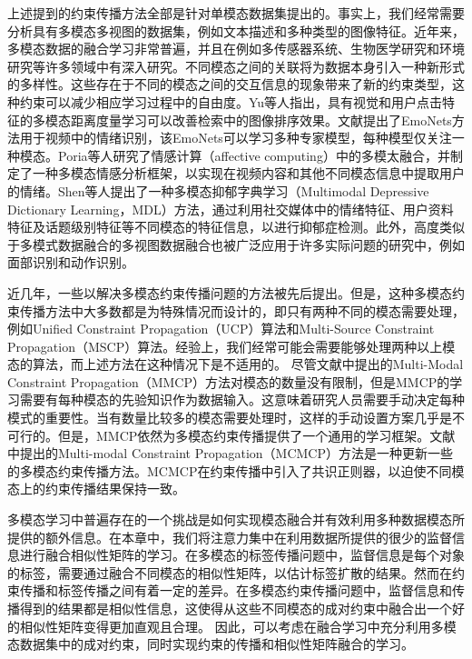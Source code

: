 上述提到的约束传播方法全部是针对单模态数据集提出的。事实上，我们经常需要分析具有多模态多视图的数据集，例如文本描述和多种类型的图像特征。近年来，多模态数据的融合学习非常普遍，并且在例如多传感器系统、生物医学研究和环境研究等许多领域中有深入研究。不同模态之间的关联将为数据本身引入一种新形式的多样性。这些存在于不同的模态之间的交互信息的现象带来了新的约束类型，这种约束可以减少相应学习过程中的自由度\cite{lahat2015multimodal}。Yu等人指出，具有视觉和用户点击特征的多模态距离度量学习可以改善检索中的图像排序效果\cite{yu2017deep}。文献\parencite{kahou2016emonets}提出了EmoNets方法用于视频中的情绪识别，该EmoNets可以学习多种专家模型，每种模型仅关注一种模态。Poria等人研究了情感计算（affective computing）中的多模太融合，并制定了一种多模态情感分析框架，以实现在视频内容和其他不同模态信息中提取用户的情绪\cite{poria2017review,poria2017ensemble}。Shen等人提出了一种多模态抑郁字典学习（Multimodal Depressive Dictionary Learning，MDL）\cite{shen2017depression}方法，通过利用社交媒体中的情绪特征、用户资料特征及话题级别特征等不同模态的特征信息，以进行抑郁症检测。此外，高度类似于多模式数据融合的多视图数据融合也被广泛应用于许多实际问题的研究中，例如面部识别\cite{kan2016multi}和动作识别\cite{shao2016kernelized}。

近几年，一些以解决多模态约束传播问题的方法被先后提出\cite{fu2011multi,fu2012modalities,lu2013unified,lu2013exhaustive}。但是，这种多模态约束传播方法中大多数都是为特殊情况而设计的，即只有两种不同的模态需要处理，例如Unified Constraint Propagation（UCP）\cite{lu2013unified}算法和Multi-Source Constraint Propagation（MSCP）\cite{lu2013exhaustive}算法。经验上，我们经常可能会需要能够处理两种以上模态的算法，而上述方法在这种情况下是不适用的。
尽管文献\parencite{fu2011multi}中提出的Multi-Modal Constraint Propagation（MMCP）方法对模态的数量没有限制，但是MMCP的学习需要有每种模态的先验知识作为数据输入。这意味着研究人员需要手动决定每种模式的重要性。当有数量比较多的模态需要处理时，这样的手动设置方案几乎是不可行的。但是，MMCP依然为多模态约束传播提供了一个通用的学习框架。文献\parencite{fu2012modalities}中提出的Multi-modal Constraint Propagation（MCMCP）方法是一种更新一些的多模态约束传播方法。MCMCP在约束传播中引入了共识正则器，以迫使不同模态上的约束传播结果保持一致。

多模态学习中普遍存在的一个挑战是如何实现模态融合并有效利用多种数据模态所提供的额外信息。在本章中，我们将注意力集中在利用数据所提供的很少的监督信息进行融合相似性矩阵的学习。在多模态的标签传播问题中，监督信息是每个对象的标签，需要通过融合不同模态的相似性矩阵，以估计标签扩散的结果。然而在约束传播和标签传播之间有着一定的差异。在多模态约束传播问题中，监督信息和传播得到的结果都是相似性信息，这使得从这些不同模态的成对约束中融合出一个好的相似性矩阵变得更加直观且合理。 因此，可以考虑在融合学习中充分利用多模态数据集中的成对约束，同时实现约束的传播和相似性矩阵融合的学习。

